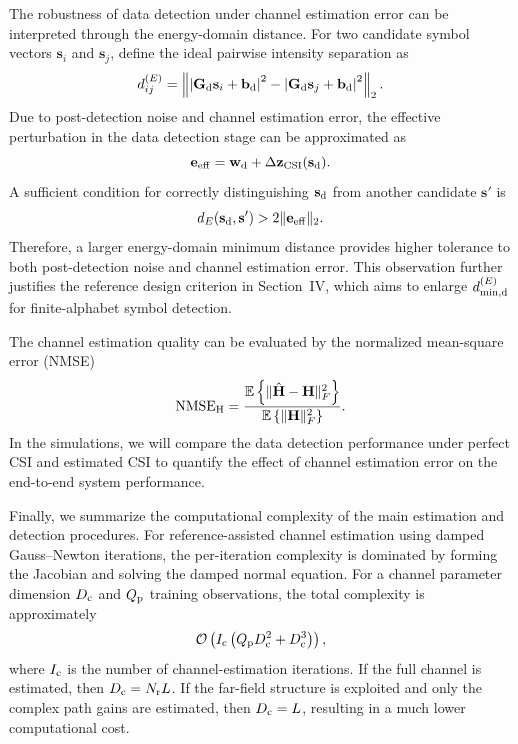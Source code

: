 \documentclass[journal]{IEEEtran}
\begin{document}
The robustness of data detection under channel estimation error can be interpreted through the energy-domain distance. 
For two candidate symbol vectors $\mathbf{s}_i$ and $\mathbf{s}_j$, define the ideal pairwise intensity separation as
\begin{equation}
d_{ij}^{(E)}
=
\left\|
\left|
\mathbf{G}_{\rm d}\mathbf{s}_i+\mathbf{b}_{\rm d}
\right|^2
-
\left|
\mathbf{G}_{\rm d}\mathbf{s}_j+\mathbf{b}_{\rm d}
\right|^2
\right\|_2.
\label{eq:ideal_pairwise_distance_csi}
\end{equation}
Due to post-detection noise and channel estimation error, the effective perturbation in the data detection stage can be approximated as
\begin{equation}
\mathbf{e}_{\rm eff}
=
\mathbf{w}_{\rm d}
+
\Delta\mathbf{z}_{\rm CSI}(\mathbf{s}_{\rm d}).
\label{eq:effective_detection_error}
\end{equation}
A sufficient condition for correctly distinguishing $\mathbf{s}_{\rm d}$ from another candidate $\mathbf{s}'$ is
\begin{equation}
d_E(\mathbf{s}_{\rm d},\mathbf{s}')
>
2\|\mathbf{e}_{\rm eff}\|_2.
\label{eq:robust_detection_condition}
\end{equation}
Therefore, a larger energy-domain minimum distance provides higher tolerance to both post-detection noise and channel estimation error. 
This observation further justifies the reference design criterion in Section~IV, which aims to enlarge $d_{\min,{\rm d}}^{(E)}$ for finite-alphabet symbol detection.

The channel estimation quality can be evaluated by the normalized mean-square error (NMSE)
\begin{equation}
\mathrm{NMSE}_{\rm H}
=
\frac{
\mathbb{E}\left\{
\|\hat{\mathbf{H}}-\mathbf{H}\|_F^2
\right\}
}{
\mathbb{E}\left\{
\|\mathbf{H}\|_F^2
\right\}
}.
\label{eq:channel_nmse}
\end{equation}
In the simulations, we will compare the data detection performance under perfect CSI and estimated CSI to quantify the effect of channel estimation error on the end-to-end system performance.

Finally, we summarize the computational complexity of the main estimation and detection procedures. 
For reference-assisted channel estimation using damped Gauss--Newton iterations, the per-iteration complexity is dominated by forming the Jacobian and solving the damped normal equation. 
For a channel parameter dimension $D_{\rm c}$ and $Q_{\rm p}$ training observations, the total complexity is approximately
\begin{equation}
\mathcal{O}
\left(
I_{\rm c}
\left(
Q_{\rm p}D_{\rm c}^{2}
+
D_{\rm c}^{3}
\right)
\right),
\label{eq:channel_estimation_total_complexity}
\end{equation}
where $I_{\rm c}$ is the number of channel-estimation iterations. 
If the full channel is estimated, then $D_{\rm c}=N_{\rm r}L$. 
If the far-field structure is exploited and only the complex path gains are estimated, then $D_{\rm c}=L$, resulting in a much lower computational cost.
\end{document}
